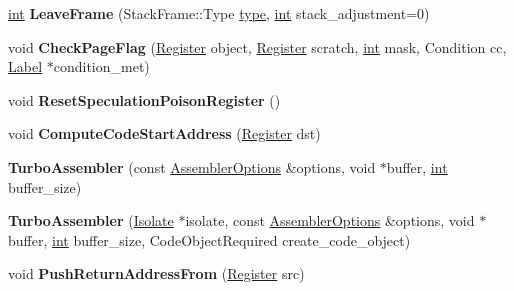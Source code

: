 \begin{DoxyCompactItemize}
\mbox{\hyperlink{classint}{int}} {\bfseries Leave\+Frame} (Stack\+Frame\+::\+Type \mbox{\hyperlink{classstd_1_1conditional_1_1type}{type}}, \mbox{\hyperlink{classint}{int}} stack\+\_\+adjustment=0)
\item 
\mbox{\label{classv8_1_1internal_1_1TurboAssembler_a1fa4aee7654610ffc02bdac3ddd102c3}} 
void {\bfseries Check\+Page\+Flag} (\mbox{\hyperlink{classv8_1_1internal_1_1Register}{Register}} object, \mbox{\hyperlink{classv8_1_1internal_1_1Register}{Register}} scratch, \mbox{\hyperlink{classint}{int}} mask, Condition cc, \mbox{\hyperlink{classv8_1_1internal_1_1Label}{Label}} $\ast$condition\+\_\+met)
\item 
\mbox{\label{classv8_1_1internal_1_1TurboAssembler_a282571b73c77ef466d68a106c557956d}} 
void {\bfseries Reset\+Speculation\+Poison\+Register} ()
\item 
\mbox{\label{classv8_1_1internal_1_1TurboAssembler_afa16b0e3be91d3616e9f613b954621dd}} 
void {\bfseries Compute\+Code\+Start\+Address} (\mbox{\hyperlink{classv8_1_1internal_1_1Register}{Register}} dst)
\item 
\mbox{\label{classv8_1_1internal_1_1TurboAssembler_ac5a1cdee47961f289dbb095cc534ef95}} 
{\bfseries Turbo\+Assembler} (const \mbox{\hyperlink{structv8_1_1internal_1_1AssemblerOptions}{Assembler\+Options}} \&options, void $\ast$buffer, \mbox{\hyperlink{classint}{int}} buffer\+\_\+size)
\item 
\mbox{\label{classv8_1_1internal_1_1TurboAssembler_ac5d3c303e7abed78a6c1fe7f9834c045}} 
{\bfseries Turbo\+Assembler} (\mbox{\hyperlink{classv8_1_1internal_1_1Isolate}{Isolate}} $\ast$isolate, const \mbox{\hyperlink{structv8_1_1internal_1_1AssemblerOptions}{Assembler\+Options}} \&options, void $\ast$buffer, \mbox{\hyperlink{classint}{int}} buffer\+\_\+size, Code\+Object\+Required create\+\_\+code\+\_\+object)
\item 
\mbox{\label{classv8_1_1internal_1_1TurboAssembler_a3db05ca3345c8e14bd3c53cef0652136}} 
void {\bfseries Push\+Return\+Address\+From} (\mbox{\hyperlink{classv8_1_1internal_1_1Register}{Register}} src)

\end{DoxyCompactItemize}
